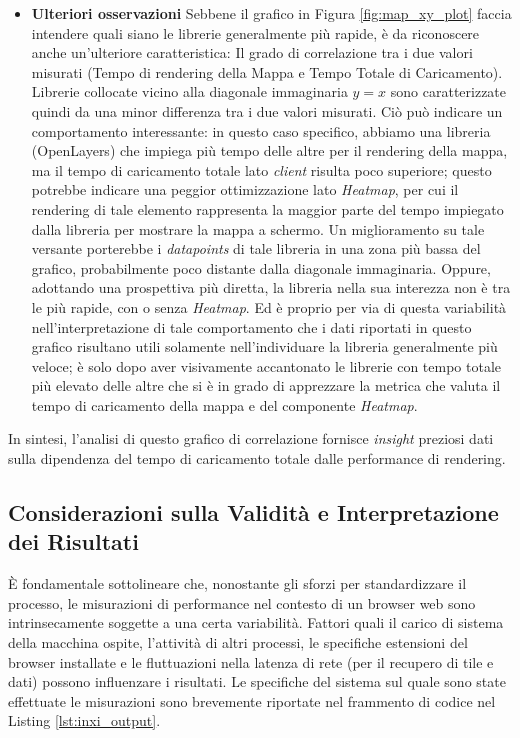 \begin{itemize}
    \item \textbf{Ulteriori osservazioni}
    Sebbene il grafico in Figura \ref{fig:map_xy_plot} faccia intendere quali siano le librerie generalmente più rapide, è da riconoscere anche un'ulteriore caratteristica: Il grado di correlazione tra i due valori misurati (Tempo di rendering della Mappa e Tempo Totale di Caricamento). Librerie collocate vicino alla diagonale immaginaria $y=x$ sono caratterizzate quindi da una minor differenza tra i due valori misurati. Ciò può indicare un comportamento interessante: in questo caso specifico, abbiamo una libreria (OpenLayers) che impiega più tempo delle altre per il rendering della mappa, ma il tempo di caricamento totale lato \textit{client} risulta poco superiore; questo potrebbe indicare una peggior ottimizzazione lato \textit{Heatmap}, per cui il rendering di tale elemento rappresenta la maggior parte del tempo impiegato dalla libreria per mostrare la mappa a schermo. Un miglioramento su tale versante porterebbe i \textit{datapoints} di tale libreria in una zona più bassa del grafico, probabilmente poco distante dalla diagonale immaginaria. Oppure, adottando una prospettiva più diretta, la libreria nella sua interezza non è tra le più rapide, con o senza \textit{Heatmap}.
    Ed è proprio per via di questa variabilità nell'interpretazione di tale comportamento che i dati riportati in questo grafico risultano utili solamente nell'individuare la libreria generalmente più veloce; è solo dopo aver visivamente accantonato le librerie con tempo totale più elevato delle altre che si è in grado di apprezzare la metrica che valuta il tempo di caricamento della mappa e del componente \textit{Heatmap}.
          
\end{itemize}

In sintesi, l'analisi di questo grafico di correlazione fornisce \textit{insight} preziosi dati sulla dipendenza del tempo di caricamento totale dalle performance di rendering.

\subsection*{Considerazioni sulla Validità e Interpretazione dei Risultati}
È fondamentale sottolineare che, nonostante gli sforzi per standardizzare il processo, le misurazioni di performance nel contesto di un browser web sono intrinsecamente soggette a una certa variabilità. Fattori quali il carico di sistema della macchina ospite, l'attività di altri processi, le specifiche estensioni del browser installate e le fluttuazioni nella latenza di rete (per il recupero di tile e dati) possono influenzare i risultati.
Le specifiche del sistema sul quale sono state effettuate le misurazioni sono brevemente riportate nel frammento di codice nel Listing \ref{lst:inxi_output}.

